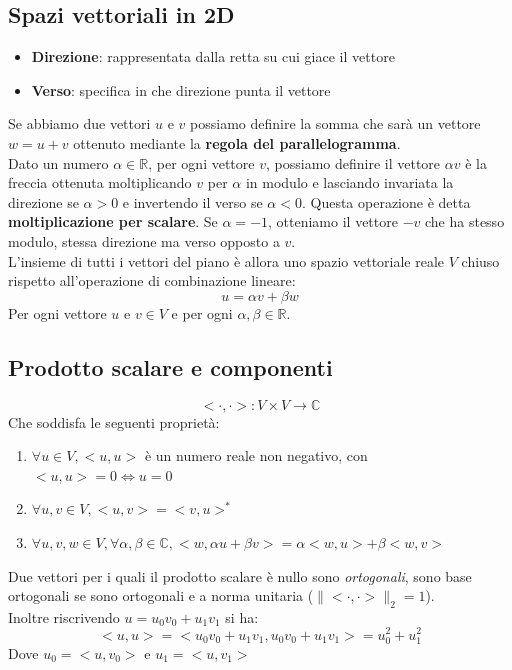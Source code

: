 \documentclass[12pt, a4paper]{report}
\begin{document}
\subsection{Spazi vettoriali in 2D}
\begin{itemize}
    \item \textbf{Direzione}: rappresentata dalla retta su cui giace il vettore
    \item \textbf{Verso}:  specifica in che direzione punta il vettore
\end{itemize}
Se abbiamo due vettori $u$ e $v$ possiamo definire la somma che sarà un vettore $w=u+v$ ottenuto mediante la \textbf{regola del parallelogramma}.\\
Dato un numero $\alpha\in \mathbb{R}$, per ogni vettore $v$, possiamo definire il vettore $\alpha v$ è la freccia ottenuta moltiplicando $v$ per $\alpha$ in modulo e lasciando invariata la direzione se $\alpha > 0$ e invertendo il verso se $\alpha < 0$. Questa operazione è detta \textbf{moltiplicazione per scalare}. Se $\alpha = -1$, otteniamo il vettore $-v$ che ha stesso modulo, stessa direzione ma verso opposto a $v$.\\
L'insieme di tutti i vettori del piano è allora uno spazio vettoriale reale $V$ chiuso rispetto all'operazione di combinazione lineare:
\begin{equation*}
    u = \alpha v + \beta w
\end{equation*}
Per ogni vettore $u$ e $v \in V$ e per ogni $\alpha, \beta \in \mathbb{R}$.
\subsection{Prodotto scalare e componenti}
\begin{equation*}
    < \cdot, \cdot > : V \times V \rightarrow \mathbb{C}
\end{equation*}
Che soddisfa le seguenti proprietà:
\begin{enumerate}
    \item $\forall u\in V, <u,u>$ è un numero reale non negativo, con $<u,u>=0 \iff u=0$
    \item $\forall u,v \in V, <u,v>=<v,u>^{*}$
    \item $\forall u,v,w \in V,\forall \alpha,\beta \in \mathbb{C}, <w,\alpha u+\beta v>=\alpha<w,u>+\beta<w,v>$
\end{enumerate}
Due vettori per i quali il prodotto scalare è nullo sono \textit{ortogonali}, sono base ortogonali se sono ortogonali e a norma unitaria ($\lVert <\cdot,\cdot>\rVert_{2}=1$).\\
Inoltre riscrivendo $u=u_{0}v_{0}+u_{1}v_{1}$ si ha:
\begin{equation*}
    <u,u>=<u_{0}v_{0}+u_{1}v_{1},u_{0}v_{0}+u_{1}v_{1}>=u_{0}^{2}+u_{1}^{2}
\end{equation*}
Dove $u_{0}=<u,v_{0}>$ e $u_{1}=<u,v_{1}>$
\end{document}
